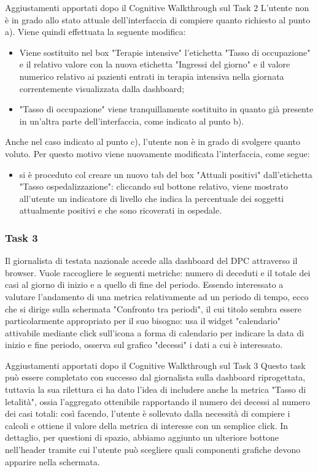 \begin{bclogo}{Aggiustamenti apportati dopo il Cognitive Walkthrough sul Task 2}
    L'utente non è in grado allo stato attuale dell'interfaccia di compiere quanto richiesto al punto a).
    Viene quindi effettuata la seguente modifica:
    \begin{itemize}
        \item Viene sostituito nel box "Terapie intensive" l'etichetta "Tasso di occupazione" e il relativo valore con la nuova etichetta "Ingressi del giorno" e il valore numerico relativo ai pazienti entrati in terapia intensiva nella giornata correntemente visualizzata dalla dashboard;
        \item "Tasso di occupazione" viene tranquillamente sostituito in quanto già presente in un'altra parte dell'interfaccia, come indicato al punto b).
    \end{itemize}
    Anche nel caso indicato al punto c), l'utente non è in grado di svolgere quanto voluto.
    Per questo motivo viene nuovamente modificata l'interfaccia, come segue:
    \begin{itemize}
        \item si è proceduto col creare un nuovo tab del box "Attuali positivi" dall'etichetta "Tasso ospedalizzazione": cliccando sul bottone relativo, viene mostrato all'utente un indicatore di livello che indica la percentuale dei soggetti attualmente positivi e che sono ricoverati in ospedale.
    \end{itemize}
\end{bclogo}

\subsubsection{Task 3}
\label{sss:cw-task-3}

Il giornalista di testata nazionale accede alla dashboard del DPC attraverso il browser.
Vuole raccogliere le seguenti metriche: numero di deceduti e il totale dei casi al giorno di inizio e a quello di fine del periodo.
Essendo interessato a valutare l'andamento di una metrica relativamente ad un periodo di tempo, ecco che si dirige sulla schermata "Confronto tra periodi", il cui titolo sembra essere particolarmente appropriato per il suo bisogno: usa il widget "calendario" attivabile mediante click sull'icona a forma di calendario per indicare la data di inizio e fine periodo, osserva sul grafico "decessi" i dati a cui è interessato.

\begin{bclogo}{Aggiustamenti apportati dopo il Cognitive Walkthrough sul Task 3}
    Questo task può essere completato con successo dal giornalista sulla dashboard riprogettata, tuttavia la sua rilettura ci ha dato l'idea di includere anche la metrica "Tasso di letalità", ossia l'aggregato ottenibile rapportando il numero dei decessi al numero dei casi totali: così facendo, l'utente è sollevato dalla necessità di compiere i calcoli e ottiene il valore della metrica di interesse con un semplice click.
    In dettaglio, per questioni di spazio, abbiamo aggiunto un ulteriore bottone nell'header tramite cui l'utente può scegliere quali componenti grafiche devono apparire nella schermata.
\end{bclogo}

